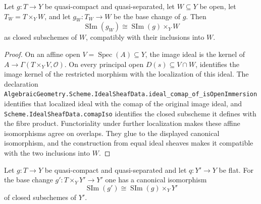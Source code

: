 \begin{lemma}
  \label{lemma:nagata-scheme-image-restrict-open}
  \leanok

  Let $g\colon T\to Y$ be quasi-compact and quasi-separated, let
  $W\subseteq Y$ be open, let $T_W=T\times_YW$, and let
  $g_W\colon T_W\to W$ be the base change of $g$.  Then
  \[
    \operatorname{SIm}(g_W)
      \cong\operatorname{SIm}(g)\times_YW
  \]
  as closed subschemes of $W$, compatibly with their inclusions into $W$.
\end{lemma}

\begin{proof}
  \leanok
  On an affine open $V=\operatorname{Spec}(A)\subseteq Y$, the image ideal is
  the kernel of
  $A\to\Gamma(T\times_YV,\mathcal O)$.  On every principal open
  $D(s)\subseteq V\cap W$,
   identifies the image
  kernel of the restricted morphism with the localization of this ideal.
  The declaration
  \texttt{AlgebraicGeometry.Scheme.IdealSheafData.ideal\_comap\_of\_isOpenImmersion}
  identifies that localized ideal with the comap of the original image ideal,
  and \texttt{Scheme.IdealSheafData.comapIso} identifies the closed
  subscheme it defines with the fibre product.  Functoriality under further
  localization makes these affine isomorphisms agree on overlaps.  They glue
  to the displayed canonical isomorphism, and the construction from equal
  ideal sheaves makes it compatible with the two inclusions into $W$.
\end{proof}

\begin{lemma}
  \label{lemma:nagata-scheme-image-flat-base-change}
  \leanok

  Let $g\colon T\to Y$ be quasi-compact and quasi-separated and let
  $q\colon Y'\to Y$ be flat.  For the base change
  $g'\colon T\times_YY'\to Y'$ one has a canonical isomorphism
  \[
    \operatorname{SIm}(g')
      \cong\operatorname{SIm}(g)\times_YY'
  \]
  of closed subschemes of $Y'$.
\end{lemma}

